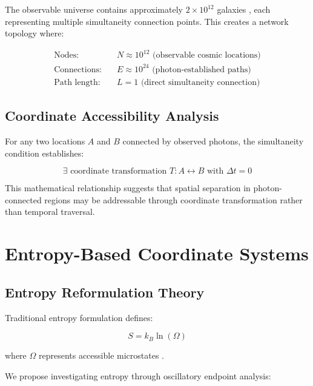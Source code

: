 \documentclass[12pt,a4paper]{article}
\begin{document}
The observable universe contains approximately $2 \times 10^{12}$ galaxies \cite{conselice2016evolution}, each representing multiple simultaneity connection points. This creates a network topology where:

\begin{align}
\text{Nodes:} &\quad N \approx 10^{12} \text{ (observable cosmic locations)} \\
\text{Connections:} &\quad E \approx 10^{24} \text{ (photon-established paths)} \\
\text{Path length:} &\quad L = 1 \text{ (direct simultaneity connection)}
\end{align}

\subsection{Coordinate Accessibility Analysis}

For any two locations $A$ and $B$ connected by observed photons, the simultaneity condition establishes:

\begin{equation}
\exists \text{ coordinate transformation } T: A \leftrightarrow B \text{ with } \Delta t = 0
\label{eq:coordinate_accessibility}
\end{equation}

This mathematical relationship suggests that spatial separation in photon-connected regions may be addressable through coordinate transformation rather than temporal traversal.

\section{Entropy-Based Coordinate Systems}

\subsection{Entropy Reformulation Theory}

Traditional entropy formulation defines:

\begin{equation}
S = k_B \ln(\Omega)
\label{eq:traditional_entropy}
\end{equation}

where $\Omega$ represents accessible microstates \cite{reif1965fundamentals}.

We propose investigating entropy through oscillatory endpoint analysis:
\end{document}
